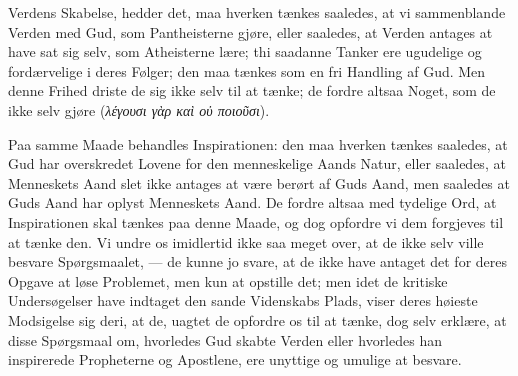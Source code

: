 \documentclass[12pt]{book}
\newcommand{\opage}[1]{\marginnote{\footnotesize\textit{[#1]}}}
\begin{document}
Verdens Skabelse, hedder det, maa hverken tænkes saaledes, at vi
sammenblande Verden med Gud, som Pantheisterne gjøre, eller saaledes,
at Verden antages at have sat sig selv, som Atheisterne lære; thi
saadanne Tanker ere ugudelige og fordærvelige i deres Følger; den maa
tænkes som en fri Handling af Gud. Men denne Frihed driste de sig ikke
selv til at tænke; de fordre altsaa Noget, som de ikke selv gjøre
(\textit{λέγουσι γὰρ καὶ οὐ ποιοῦσι}).

Paa samme Maade behandles Inspirationen: den maa hverken tænkes
saaledes, at Gud har overskredet Lovene for den menneskelige Aands
Natur, eller saaledes, at Menneskets Aand slet ikke antages at være
berørt af Guds Aand, men saaledes at Guds Aand har oplyst Menneskets
Aand. De fordre altsaa med tydelige Ord, at Inspirationen skal tænkes
paa denne Maade, og dog opfordre vi dem forgjeves til at tænke den. Vi
undre os imidlertid ikke saa meget over, at de ikke selv ville besvare
Spørgsmaalet, --- de kunne jo svare, at de ikke have antaget det for
deres Opgave at løse Problemet, men kun at opstille det; men idet de
kritiske Undersøgelser have indtaget den sande Videnskabs Plads, viser
deres høieste Modsigelse sig deri, at de, uagtet de opfordre os til at
tænke, dog selv erklære, at disse Spørgsmaal om, hvorledes
\opage{36} Gud skabte Verden eller hvorledes han inspirerede Propheterne og
Apostlene, ere unyttige og umulige at besvare.
\end{document}
